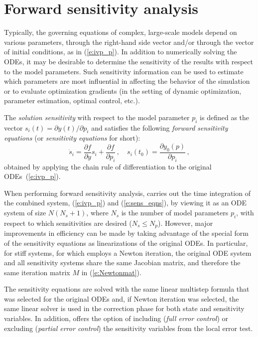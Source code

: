 \section{Forward sensitivity analysis}\label{ss:fwd_sensi}

Typically, the governing equations of complex, large-scale models
depend on various parameters,  through the right-hand side vector 
and/or through the vector of initial conditions, as in (\ref{e:ivp_p}).
In addition to numerically solving the ODEs, it may be desirable to
determine the sensitivity of the results with respect to the model
parameters. 
Such sensitivity information can be used to estimate which
parameters are most influential in affecting the behavior of the
simulation or to evaluate optimization gradients (in the setting of dynamic
optimization, parameter estimation, optimal control, etc.).

The {\em solution sensitivity} with respect to the model parameter
$p_i$ is defined as the vector 
$s_i (t) = {\partial y(t)}/{\partial p_i}$
and satisfies the following {\em forward sensitivity equations}
(or {\em sensitivity equations} for short):
\begin{equation}\label{e:sens_eqns}
{{\dot s}_i}  = \frac{\partial f}{\partial y} s_i + \frac{\partial f}{\partial p_i} \, ,
\quad s_i(t_0)  = \frac{\partial y_{0}(p)}{\partial p_i} \, ,
\end{equation}
obtained by applying the chain rule of differentiation to the original
ODEs~(\ref{e:ivp_p}). 

When performing forward sensitivity analysis, {\cvodes} carries out
the time integration of the combined system, (\ref{e:ivp_p}) and
(\ref{e:sens_eqns}), by viewing it as an ODE system of size
$N(N_s+1)$, where $N_s$ is the number of model parameters $p_i$, with
respect to which sensitivities are desired ($N_s \le N_p$).
However, major improvements in efficiency can be made by taking
advantage of the special form of the sensitivity equations as
linearizations of the original ODEs.  In particular, for stiff
systems, for which {\cvodes} employs a Newton iteration, the original
ODE system and all sensitivity systems share the same Jacobian matrix,
and therefore the same iteration matrix $M$ in (\ref{e:Newtonmat}).

The sensitivity equations are solved with the same linear multistep formula that
was selected for the original ODEs and, if Newton iteration was selected, the
same linear solver is used in the correction phase for both state and sensitivity 
variables. In addition, {\cvodes} offers the option of including
({\em full error control}) or excluding
({\em partial error control}) the sensitivity variables from the local 
error test.

